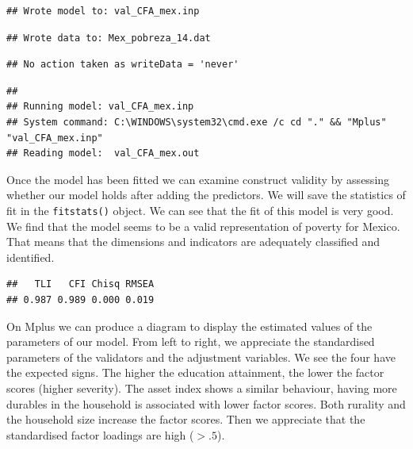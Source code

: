 \documentclass[]{book}
\newenvironment{Shaded}{\begin{snugshade}}{\end{snugshade}}
\newcommand{\DataTypeTok}[1]{\textcolor[rgb]{0.13,0.29,0.53}{#1}}
\newcommand{\KeywordTok}[1]{\textcolor[rgb]{0.13,0.29,0.53}{\textbf{#1}}}
\newcommand{\NormalTok}[1]{#1}
\newcommand{\OperatorTok}[1]{\textcolor[rgb]{0.81,0.36,0.00}{\textbf{#1}}}
\begin{document}
\begin{verbatim}
## Wrote model to: val_CFA_mex.inp
\end{verbatim}

\begin{verbatim}
## Wrote data to: Mex_pobreza_14.dat
\end{verbatim}

\begin{verbatim}
## No action taken as writeData = 'never'
\end{verbatim}

\begin{verbatim}
## 
## Running model: val_CFA_mex.inp 
## System command: C:\WINDOWS\system32\cmd.exe /c cd "." && "Mplus" "val_CFA_mex.inp" 
## Reading model:  val_CFA_mex.out
\end{verbatim}

Once the model has been fitted we can examine construct validity by assessing whether our model holds after adding the predictors. We will save the statistics of fit in the \texttt{fitstats()} object. We can see that the fit of this model is very good. We find that the model seems to be a valid representation of poverty for Mexico. That means that the dimensions and indicators are adequately classified and identified.

\begin{Shaded}
\end{Shaded}

\begin{verbatim}
##   TLI   CFI Chisq RMSEA 
## 0.987 0.989 0.000 0.019
\end{verbatim}

On Mplus we can produce a diagram to display the estimated values of the parameters of our model. From left to right, we appreciate the standardised parameters of the validators and the adjustment variables. We see the four have the expected signs. The higher the education attainment, the lower the factor scores (higher severity). The asset index shows a similar behaviour, having more durables in the household is associated with lower factor scores. Both rurality and the household size increase the factor scores. Then we appreciate that the standardised factor loadings are high (\(>.5\)).
\end{document}
